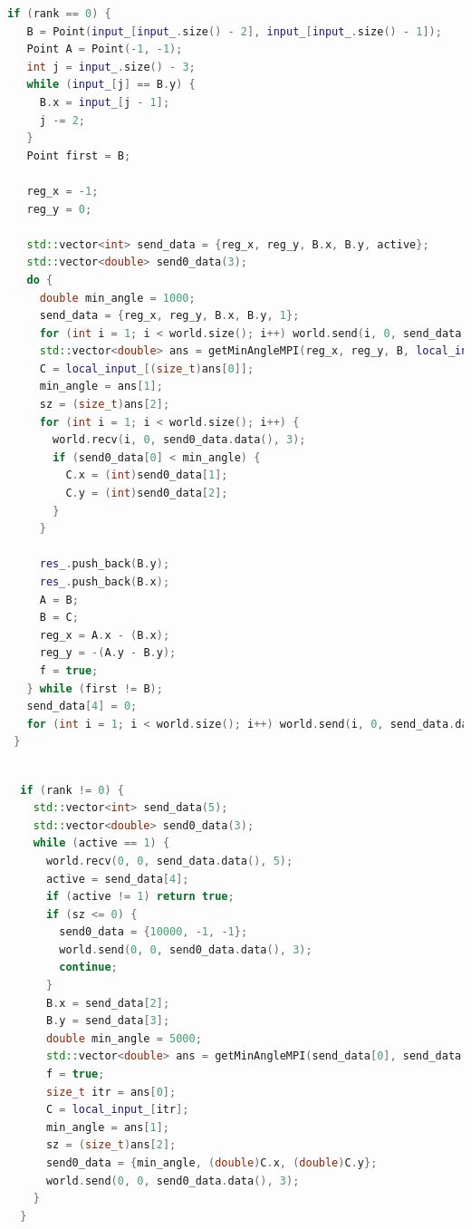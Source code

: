\documentclass[a4paper]{article}
\begin{document}
\begin{lstlisting}[language=C++, caption=Распрараллеливание Процесс 0:, label=lst:example]
 if (rank == 0) {
   B = Point(input_[input_.size() - 2], input_[input_.size() - 1]);
   Point A = Point(-1, -1);
   int j = input_.size() - 3;
   while (input_[j] == B.y) {
     B.x = input_[j - 1];
     j -= 2;
   }
   Point first = B;

   reg_x = -1;
   reg_y = 0;

   std::vector<int> send_data = {reg_x, reg_y, B.x, B.y, active};
   std::vector<double> send0_data(3);
   do {
     double min_angle = 1000;
     send_data = {reg_x, reg_y, B.x, B.y, 1};
     for (int i = 1; i < world.size(); i++) world.send(i, 0, send_data.data(), 5);
     std::vector<double> ans = getMinAngleMPI(reg_x, reg_y, B, local_input_, f);
     C = local_input_[(size_t)ans[0]];
     min_angle = ans[1];
     sz = (size_t)ans[2];
     for (int i = 1; i < world.size(); i++) {
       world.recv(i, 0, send0_data.data(), 3);
       if (send0_data[0] < min_angle) {
         C.x = (int)send0_data[1];
         C.y = (int)send0_data[2];
       }
     }

     res_.push_back(B.y);
     res_.push_back(B.x);
     A = B;
     B = C;
     reg_x = A.x - (B.x);
     reg_y = -(A.y - B.y); 
     f = true;
   } while (first != B);
   send_data[4] = 0;
   for (int i = 1; i < world.size(); i++) world.send(i, 0, send_data.data(), 5);
 }

\end{lstlisting}


\begin{lstlisting}[language=C++, caption=Распрараллеливание Процесс не 0:, label=lst:example]
 
  if (rank != 0) {
    std::vector<int> send_data(5);
    std::vector<double> send0_data(3);
    while (active == 1) {
      world.recv(0, 0, send_data.data(), 5);
      active = send_data[4];
      if (active != 1) return true;
      if (sz <= 0) {
        send0_data = {10000, -1, -1};
        world.send(0, 0, send0_data.data(), 3);
        continue;
      }
      B.x = send_data[2];
      B.y = send_data[3];
      double min_angle = 5000;
      std::vector<double> ans = getMinAngleMPI(send_data[0], send_data[1], B, local_input_, f);
      f = true;
      size_t itr = ans[0];
      C = local_input_[itr];
      min_angle = ans[1];
      sz = (size_t)ans[2];
      send0_data = {min_angle, (double)C.x, (double)C.y};
      world.send(0, 0, send0_data.data(), 3);
    }
  }
\end{lstlisting}
\end{document}
